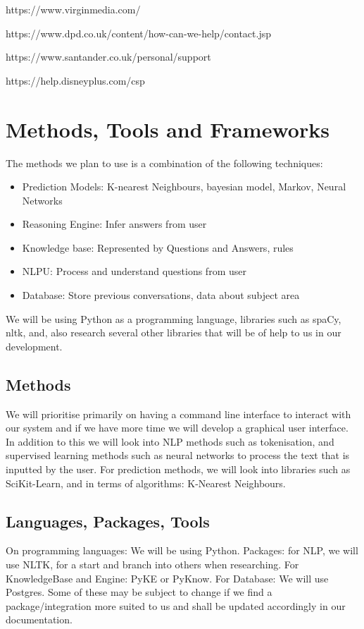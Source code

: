 \documentclass[11pt]{cmpreport}
\begin{document}
https://www.virginmedia.com/

https://www.dpd.co.uk/content/how-can-we-help/contact.jsp

https://www.santander.co.uk/personal/support

https://help.disneyplus.com/csp

\section{Methods, Tools and Frameworks}
The methods we plan to use is a combination of the following techniques: 
\begin{itemize}
    \item Prediction Models: K-nearest Neighbours, bayesian model, Markov, Neural Networks
    \item Reasoning Engine: Infer answers from user
    \item Knowledge base: Represented by Questions and Answers, rules
    \item NLPU: Process and understand questions from user
    \item Database: Store previous conversations, data about subject area
\end{itemize}
We will be using Python as a programming language, libraries such as spaCy, nltk, and, also research several other libraries that will be of help to us in our development.

\subsection{Methods}

We will prioritise primarily on having a command line interface to interact with our system and if we have more time we will develop a graphical user interface.
In addition to this we will look into NLP methods such as tokenisation, and supervised learning methods such as neural networks to process the text that is inputted by the user. For prediction methods, we will look into libraries such as SciKit-Learn, and in terms of algorithms: K-Nearest Neighbours.
\subsection{Languages, Packages, Tools}

On programming languages: We will be using Python. 
Packages: for NLP, we will use NLTK\citep{NLTK}, for a start and branch into others when researching. 
For KnowledgeBase and Engine: PyKE or PyKnow. 
For Database: We will use Postgres.
Some of these may be subject to change if we find a package/integration more suited to us and shall be updated accordingly in our documentation.
 
\end{document}
